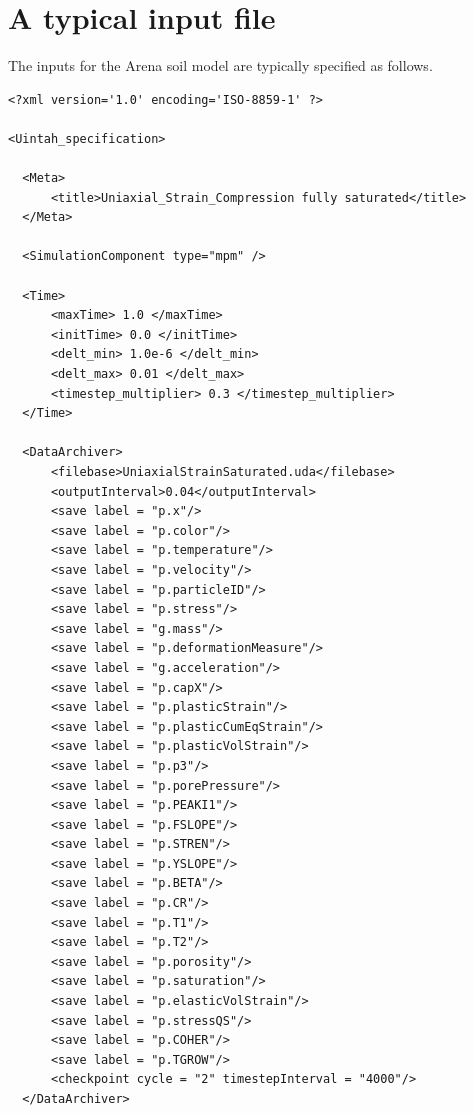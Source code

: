 \documentclass[11pt,a4paper]{article}
\begin{document}
\section{A typical input file}
The inputs for the Arena soil model are typically specified as follows.
\lstset{
  language=XML
}
\begin{lstlisting}
<?xml version='1.0' encoding='ISO-8859-1' ?>

<Uintah_specification>

  <Meta>
      <title>Uniaxial_Strain_Compression fully saturated</title>
  </Meta>

  <SimulationComponent type="mpm" />

  <Time>
      <maxTime> 1.0 </maxTime>
      <initTime> 0.0 </initTime>
      <delt_min> 1.0e-6 </delt_min>
      <delt_max> 0.01 </delt_max>
      <timestep_multiplier> 0.3 </timestep_multiplier>
  </Time>

  <DataArchiver>
      <filebase>UniaxialStrainSaturated.uda</filebase>
      <outputInterval>0.04</outputInterval>
      <save label = "p.x"/>
      <save label = "p.color"/>
      <save label = "p.temperature"/>
      <save label = "p.velocity"/>
      <save label = "p.particleID"/>
      <save label = "p.stress"/>
      <save label = "g.mass"/>
      <save label = "p.deformationMeasure"/>
      <save label = "g.acceleration"/>
      <save label = "p.capX"/>
      <save label = "p.plasticStrain"/>
      <save label = "p.plasticCumEqStrain"/>
      <save label = "p.plasticVolStrain"/>
      <save label = "p.p3"/>
      <save label = "p.porePressure"/>
      <save label = "p.PEAKI1"/>
      <save label = "p.FSLOPE"/>
      <save label = "p.STREN"/>
      <save label = "p.YSLOPE"/>
      <save label = "p.BETA"/>
      <save label = "p.CR"/>
      <save label = "p.T1"/>
      <save label = "p.T2"/>
      <save label = "p.porosity"/>
      <save label = "p.saturation"/>
      <save label = "p.elasticVolStrain"/>
      <save label = "p.stressQS"/>
      <save label = "p.COHER"/>
      <save label = "p.TGROW"/>
      <checkpoint cycle = "2" timestepInterval = "4000"/>
  </DataArchiver>


\end{lstlisting}
\end{document}
